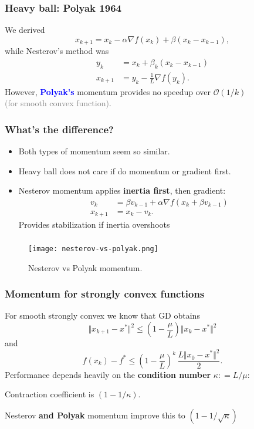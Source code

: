 \documentclass[aspectratio=149]{beamer}
\begin{document}
\begin{frame}
  \frametitle{Heavy ball:  Polyak 1964}
  We derived
  \begin{equation}
    x_{k+1} = x_k - \alpha \nabla f(x_k) + \beta (x_k - x_{k-1}),
  \end{equation}
  while Nesterov's method was
  \begin{align}
    y_{k} &= x_k + \beta_k (x_k - x_{k-1}) \\
    x_{k+1} &= y_k - \frac{1}{L} \nabla f(y_k).
  \end{align}
  However, \textcolor{blue}{\textbf{Polyak's}} momentum provides no speedup over $\mathcal{O}(1/k)$ \\
  \textcolor{gray}{(for smooth convex function)}.
\end{frame}


\begin{frame}
  \frametitle{What's the difference?}
  \begin{itemize}
    \item Both types of momentum seem so similar.
    \item Heavy ball does not care if do momentum or gradient first.
    \item Nesterov momentum applies \textbf{inertia first}, then gradient:
          \begin{align}
            v_k &= \beta v_{k-1} + \alpha \nabla f(x_k + \beta v_{k-1}) \\
            x_{k+1} &= x_k - v_k.
          \end{align}
          Provides stabilization if inertia overshoots
  \end{itemize}
\end{frame}

\begin{frame}
  \frametitle{}

  \begin{figure}[ht]
    \centering
    \texttt{[image: nesterov-vs-polyak.png]}
    \caption{Nesterov vs Polyak momentum.}
  \end{figure}
\end{frame}

\begin{frame}
  \frametitle{Momentum for strongly convex functions}

  For smooth strongly convex we know that GD obtains
  \begin{equation}
    \Vert x_{k+1} - x^* \Vert^2 \le \left(1 - \frac{\mu}{L}\right) \Vert x_k -x^* \Vert^2
  \end{equation}
  and
  \begin{equation}
    f(x_k)-f^* \le {\left(1-\frac{\mu}{L}\right)}^k \, \frac{L \Vert x_0 -x^* \Vert^2}{2}.
  \end{equation}
  Performance depends heavily on the \textbf{condition number} $\kappa : = L/\mu$:
  \begin{block}{}
    Contraction coefficient is $(1-1/\kappa)$.
  \end{block}

  Nesterov \textbf{and Polyak} momentum improve this to $(1-1/\sqrt{\kappa})$
\end{frame}
\end{document}
